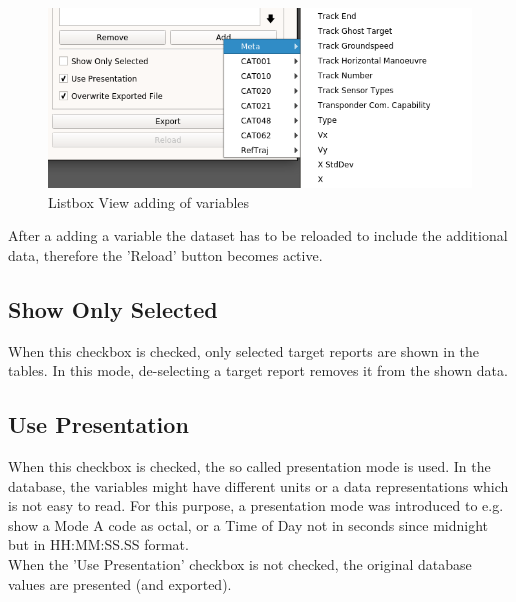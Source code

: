 \begin{figure}[H]
    \includegraphics[width=16cm,frame]{figures/listbox_add.png}
  \caption{Listbox View adding of variables}
\end{figure}

After a adding a variable the dataset has to be reloaded to include the additional data, therefore the 'Reload' button becomes active.

\subsection{Show Only Selected}

When this checkbox is checked, only selected target reports are shown in the tables. In this mode, de-selecting a target report removes it from the shown data.

\subsection{Use Presentation}

When this checkbox is checked, the so called presentation mode is used. In the database, the variables might have different units or a data representations which is not easy to read. 
For this purpose, a presentation mode was introduced to e.g. show a Mode A code as octal, or a Time of Day not in seconds since midnight but in HH:MM:SS.SS format. \\

When the 'Use Presentation' checkbox is not checked, the original database values are presented (and exported).


